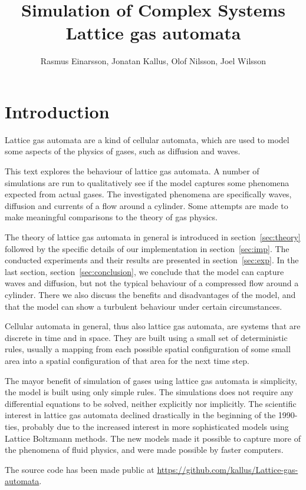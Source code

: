 \documentclass[12pt,a4paper]{article}
\author{Rasmus Einarsson, Jonatan Kallus, Olof Nilsson, Joel Wilsson}
\title{Simulation of Complex Systems\\Lattice gas automata}
\begin{document}
\maketitle

\section{Introduction}
Lattice gas automata are a kind of cellular automata, which are used to model some aspects of the physics of gases, such as diffusion and waves.

This text explores the behaviour of lattice gas automata. A number of simulations are run to qualitatively see if the model captures some phenomena expected from actual gases. The investigated phenomena are specifically waves, diffusion and currents of a flow around a cylinder. Some attempts are made to make meaningful comparisons to the theory of gas physics.

The theory of lattice gas automata in general is introduced in section~\ref{sec:theory} followed by the specific details of our implementation in section~\ref{sec:imp}. The conducted experiments and their results are presented in section~\ref{sec:exp}. In the last section, section~\ref{sec:conclusion}, we conclude that the model can capture waves and diffusion, but not the typical behaviour of a compressed flow around a cylinder. There we also discuss the benefits and disadvantages of the model, and that the model can show a turbulent behaviour under certain circumstances.

Cellular automata in general, thus also lattice gas automata, are systems that are discrete in time and in space. They are built using a small set of deterministic rules, usually a mapping from each possible spatial configuration of some small area into a spatial configuration of that area for the next time step.

The mayor benefit of simulation of gases using lattice gas automata is simplicity, the model is built using only simple rules. The simulations does not require any differential equations to be solved, neither explicitly nor implicitly. The scientific interest in lattice gas automata declined drastically in the beginning of the 1990-ties, probably due to the increased interest in more sophisticated models using Lattice Boltzmann methods. The new models made it possible to capture more of the phenomena of fluid physics, and were made possible by faster computers.

The source code has been made public at \url{https://github.com/kallus/Lattice-gas-automata}.
\end{document}
